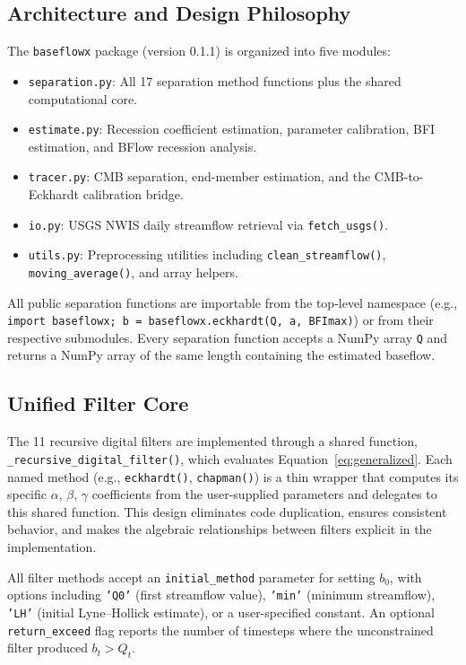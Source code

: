 \documentclass[hydrology,article,submit,pdftex,moreauthors]{Definitions/mdpi}
\begin{document}
\subsection{Architecture and Design Philosophy}
\label{sec:architecture}

The \texttt{baseflowx} package (version 0.1.1) is organized into five modules:

\begin{itemize}[nosep]
\item \texttt{separation.py}: All 17 separation method functions plus the shared computational core.
\item \texttt{estimate.py}: Recession coefficient estimation, parameter calibration, BFI estimation, and BFlow recession analysis.
\item \texttt{tracer.py}: CMB separation, end-member estimation, and the CMB-to-Eckhardt calibration bridge.
\item \texttt{io.py}: USGS NWIS daily streamflow retrieval via \texttt{fetch\_usgs()}.
\item \texttt{utils.py}: Preprocessing utilities including \texttt{clean\_streamflow()}, \texttt{moving\_average()}, and array helpers.
\end{itemize}

All public separation functions are importable from the top-level namespace (e.g., \texttt{import baseflowx; b = baseflowx.eckhardt(Q, a, BFImax)}) or from their respective submodules. Every separation function accepts a NumPy array \texttt{Q} and returns a NumPy array of the same length containing the estimated baseflow.

\subsection{Unified Filter Core}
\label{sec:filter_core}

The 11 recursive digital filters are implemented through a shared function, \texttt{\_recursive\_digital\_filter()}, which evaluates Equation~\ref{eq:generalized}. Each named method (e.g., \texttt{eckhardt()}, \texttt{chapman()}) is a thin wrapper that computes its specific $\alpha$, $\beta$, $\gamma$ coefficients from the user-supplied parameters and delegates to this shared function. This design eliminates code duplication, ensures consistent behavior, and makes the algebraic relationships between filters explicit in the implementation.

All filter methods accept an \texttt{initial\_method} parameter for setting $b_0$, with options including \texttt{'Q0'} (first streamflow value), \texttt{'min'} (minimum streamflow), \texttt{'LH'} (initial Lyne--Hollick estimate), or a user-specified constant. An optional \texttt{return\_exceed} flag reports the number of timesteps where the unconstrained filter produced $b_t > Q_t$.
\end{document}
